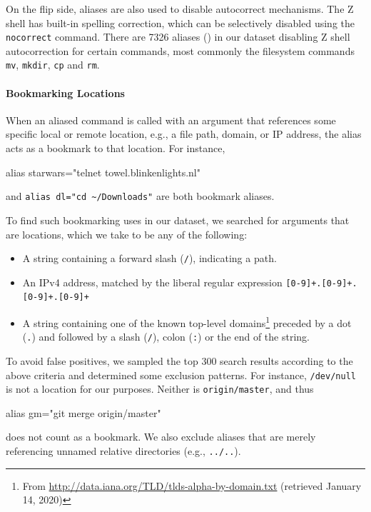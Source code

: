 On the flip side, aliases are also used to disable autocorrect mechanisms.
The Z shell has built-in spelling correction, which can be selectively disabled using the \verb|nocorrect| command.
There are \num{7326} aliases () in our dataset disabling Z shell autocorrection for certain commands, most commonly the filesystem commands \verb|mv|, \verb|mkdir|, \verb|cp| and \verb|rm|.

\paragraph{\bf Bookmarking Locations}

When an aliased command is called with an argument that references some specific local or remote location, e.g., a file path, domain, or IP address, the alias acts as a bookmark to that location.
For instance,
\begin{CVerbatim}
alias starwars="telnet towel.blinkenlights.nl"    
\end{CVerbatim}
and \verb|alias dl="cd ~/Downloads"|
are both bookmark aliases.

To find such bookmarking uses in our dataset, we searched for arguments that are locations, which we take to be any of the following:
\begin{itemize}
    \item A string containing a forward slash (\verb|/|), indicating a path.
    \item An IPv4 address, matched by the liberal regular expression \verb|[0-9]+.[0-9]+.[0-9]+.[0-9]+|
    \item A string containing one of the known top-level domains\footnote{From \url{http://data.iana.org/TLD/tlds-alpha-by-domain.txt} (retrieved January 14, 2020)} preceded by a dot (\verb|.|) and followed by a slash (\verb|/|), colon (\verb|:|) or the end of the string.
\end{itemize}
To avoid false positives, we sampled the top 300 search results according to the above criteria and determined some exclusion patterns.
For instance, \texttt{/dev/null} is not a location for our purposes.
Neither is \texttt{origin/master}, and thus 
\begin{CVerbatim}
alias gm="git merge origin/master"
\end{CVerbatim}
does not count as a bookmark.
We also exclude aliases that are merely referencing unnamed relative directories (e.g., \verb|../..|).

